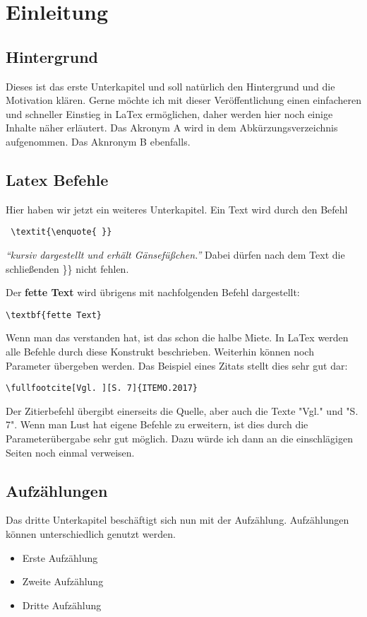 \section{Einleitung}
\subsection{Hintergrund}
Dieses ist das erste Unterkapitel und soll natürlich den Hintergrund und die Motivation klären. Gerne möchte ich mit dieser Veröffentlichung einen einfacheren und schneller Einstieg in LaTex ermöglichen, daher werden hier noch einige Inhalte näher erläutert. Das Akronym \ac{A} wird in dem Abkürzungsverzeichnis aufgenommen. Das Aknronym \ac{B} ebenfalls.


\subsection{Latex Befehle}
Hier haben wir jetzt ein weiteres Unterkapitel. Ein Text wird durch den Befehl \begin{verbatim} \textit{\enquote{ }} \end{verbatim} \textit{\enquote{kursiv dargestellt und erhält Gänsefüßchen.}} Dabei dürfen nach dem Text die schließenden  \}\} nicht fehlen.

Der \textbf{fette Text} wird übrigens mit nachfolgenden Befehl dargestellt:
\begin{verbatim}
\textbf{fette Text}
\end{verbatim}

Wenn man das verstanden hat, ist das schon die halbe Miete. In LaTex werden alle Befehle durch diese Konstrukt beschrieben. Weiterhin können noch Parameter übergeben werden. Das Beispiel eines Zitats stellt dies sehr gut dar:
\begin{verbatim}
\fullfootcite[Vgl. ][S. 7]{ITEMO.2017} 
\end{verbatim}
Der Zitierbefehl übergibt einerseits die Quelle, aber auch die Texte "Vgl." und "S. 7". Wenn man Lust hat eigene Befehle zu erweitern, ist dies durch die Parameterübergabe sehr gut möglich. Dazu würde ich dann an die einschlägigen Seiten noch einmal verweisen. 



\subsection{Aufzählungen}
Das dritte Unterkapitel beschäftigt sich nun mit der Aufzählung. Aufzählungen können unterschiedlich genutzt werden.
\begin{itemize}
	\item Erste Aufzählung
	\item Zweite Aufzählung
	\item Dritte Aufzählung	
\end{itemize}

